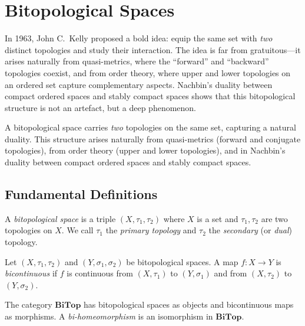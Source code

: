 \chapter{Bitopological Spaces}
\label{ch:bitopological}

In 1963, John C.\ Kelly proposed a bold idea: equip the same set with \emph{two} distinct topologies and study their interaction. The idea is far from gratuitous---it arises naturally from quasi-metrics, where the ``forward'' and ``backward'' topologies coexist, and from order theory, where upper and lower topologies on an ordered set capture complementary aspects. Nachbin's duality between compact ordered spaces and stably compact spaces shows that this bitopological structure is not an artefact, but a deep phenomenon.

\begin{intuition}
A bitopological space carries \emph{two} topologies on the same set, capturing a natural
duality. This structure arises naturally from quasi-metrics (forward and conjugate
topologies), from order theory (upper and lower topologies), and in Nachbin's duality
between compact ordered spaces and stably compact spaces.
\end{intuition}

\section{Fundamental Definitions}

\begin{definition}
A \emph{bitopological space} is a triple $(X, \tau_1, \tau_2)$ where $X$ is a set and
$\tau_1, \tau_2$ are two topologies on $X$. We call $\tau_1$ the \emph{primary topology}
and $\tau_2$ the \emph{secondary} (or \emph{dual}) topology.
\end{definition}

\begin{definition}
Let $(X, \tau_1, \tau_2)$ and $(Y, \sigma_1, \sigma_2)$ be bitopological spaces. A map
$f\colon X \to Y$ is \emph{bicontinuous} if $f$ is continuous from $(X,\tau_1)$ to
$(Y,\sigma_1)$ and from $(X,\tau_2)$ to $(Y,\sigma_2)$.
\end{definition}

\begin{definition}
The category $\mathbf{BiTop}$ has bitopological spaces as objects and bicontinuous maps as
morphisms. A \emph{bi-homeomorphism} is an isomorphism in $\mathbf{BiTop}$.
\end{definition}

